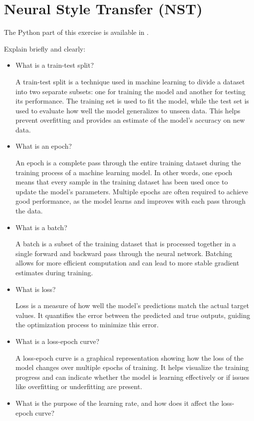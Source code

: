 \section{Neural Style Transfer (NST)}

The Python part of this exercise is available in .\\

\begin{ejercicio}
    Explain briefly and clearly:
    \begin{itemize}
        \item What is a train-test split?
        
        A train-test split is a technique used in machine learning to divide a dataset into two separate subsets: one for training the model and another for testing its performance. The training set is used to fit the model, while the test set is used to evaluate how well the model generalizes to unseen data. This helps prevent overfitting and provides an estimate of the model's accuracy on new data.
        \item What is an epoch?
        
        An epoch is a complete pass through the entire training dataset during the training process of a machine learning model. In other words, one epoch means that every sample in the training dataset has been used once to update the model's parameters. Multiple epochs are often required to achieve good performance, as the model learns and improves with each pass through the data.
        \item What is a batch?
        
        A batch is a subset of the training dataset that is processed together in a single forward and backward pass through the neural network. Batching allows for more efficient computation and can lead to more stable gradient estimates during training.
        \item What is loss?
        
        Loss is a measure of how well the model's predictions match the actual target values. It quantifies the error between the predicted and true outputs, guiding the optimization process to minimize this error.
        \item What is a loss-epoch curve?
        
        A loss-epoch curve is a graphical representation showing how the loss of the model changes over multiple epochs of training. It helps visualize the training progress and can indicate whether the model is learning effectively or if issues like overfitting or underfitting are present.
        \item What is the purpose of the learning rate, and how does it affect the loss-epoch curve?
        

\end{itemize}
\end{ejercicio}
